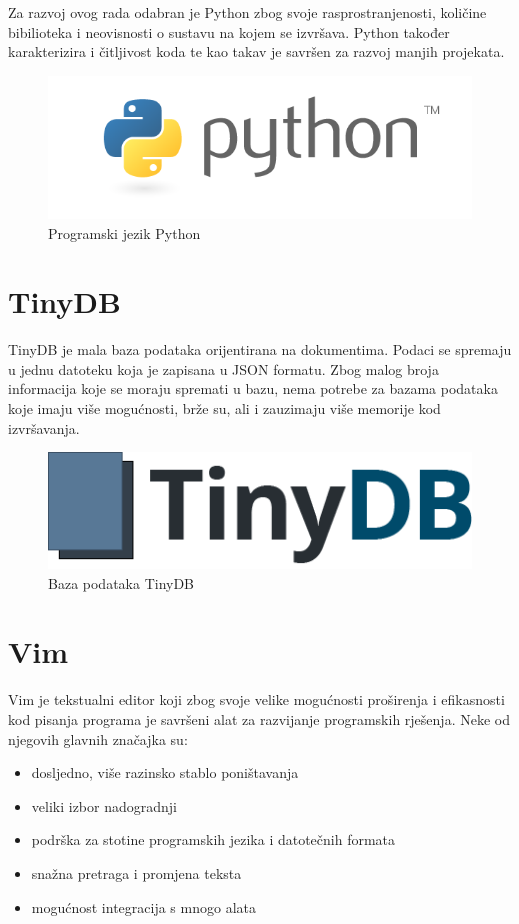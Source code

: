 \documentclass[times, utf8, zavrsni]{fer}
\begin{document}
Za razvoj ovog rada odabran je Python zbog svoje rasprostranjenosti, količine bibilioteka i neovisnosti o sustavu na kojem se izvršava. Python također karakterizira i čitljivost koda te kao takav je savršen za razvoj manjih projekata.

\begin{figure}[h]
\includegraphics[scale=0.5]{python.png}
\centering
\caption{Programski jezik Python}
\centering
\end{figure}

\section{TinyDB}
TinyDB je mala baza podataka orijentirana na dokumentima. Podaci se spremaju u jednu datoteku koja je zapisana u JSON formatu. Zbog malog broja informacija koje se moraju spremati u bazu, nema potrebe za bazama podataka koje imaju više mogućnosti, brže su, ali i zauzimaju više memorije kod izvršavanja.

\begin{figure}[h]
\includegraphics[scale=0.4]{tinydb.png}
\centering
\caption{Baza podataka TinyDB}
\centering
\end{figure}

\section{Vim}
Vim je tekstualni editor koji zbog svoje velike mogućnosti proširenja i efikasnosti kod pisanja programa je savršeni alat za razvijanje programskih rješenja. Neke od njegovih glavnih značajka su:
\begin{itemize}
\item dosljedno, više razinsko stablo poništavanja
\item veliki izbor nadogradnji
\item podrška za stotine programskih jezika i datotečnih formata
\item snažna pretraga i promjena teksta
\item mogućnost integracija s mnogo alata
\end{itemize}
\end{document}
